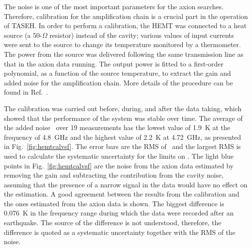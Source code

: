 
The noise is one of the most important parameters for the axion searches. 
Therefore, calibration for the amplification chain is a 
crucial part in the operation of TASEH. In order to perform a calibration, 
the HEMT was connected to a heat source (a 50-$\Omega$ resistor) instead of 
the cavity; 
various values of input currents were sent to the source to change its 
temperature monitored by a thermometer. The power from the source 
was delivered following the same transmission line as that in the axion 
data running. 
The output power is fitted to a first-order polynomial, as a function of 
the source temperature, to extract the gain and added noise for the 
amplification chain. More details of the 
procedure can be found in Ref.~\cite{TASEHInstrumentation}. 

The calibration was carried out before, during, and after the data taking, 
which showed that the performance of the system was stable over time. The 
average of the added noise \ta\ over 19 measurements has the lowest value of 
1.9~K at the frequency of 4.8~GHz and the highest value of 
2.2~K at 4.72~GHz, as presented in Fig.~\ref{fig:hemtcalvsf}. 
The error bars are the RMS of \ta\ and the largest RMS is used to calculate 
the systematic uncertainty for the limits on \gagg. The light blue points in 
Fig.~\ref{fig:hemtcalvsf} are the noise from the axion data estimated by 
removing the gain and subtracting the contribution from the cavity noise, 
assuming 
that the presence of a narrow signal in the data would have no effect on the 
estimation. A good agreement between the results from the calibration  
and the ones estimated from the axion data is shown. The biggest 
difference is 0.076~K in the frequency range during which the data were 
recorded after an earthquake. The source of the difference is not understood, 
therefore, the difference is quoted as a systematic uncertainty together 
with the RMS of the noise.



  

